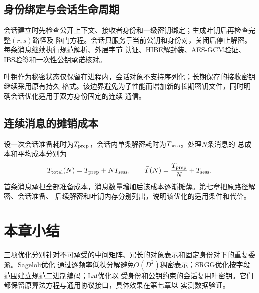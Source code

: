 \subsection{身份绑定与会话生命周期}

会话建立时先检查公开上下文、接收者身份和一级密钥绑定；生成叶钥后再检查完整$(r,s)$路径及
陷门方程。会话只服务于当前公钥和身份对，关闭后停止解密。每条消息继续执行规范解析、外层字节
认证、HIBE解封装、AES-GCM验证、IBS验签和一次性公钥承诺核对。

叶钥作为秘密状态仅保留在进程内，会话对象不支持序列化；长期保存的接收密钥继续采用原有持久
格式。该边界避免为了性能而增加新的长期密钥文件，同时明确会话优化适用于双方身份固定的连续
通信。

\subsection{连续消息的摊销成本}

设一次会话准备耗时为$T_{\rm prep}$，会话内单条解密耗时为$T_{\rm sess}$。处理$N$条消息的
总成本和平均成本分别为
\[
 T_{\rm total}(N)=T_{\rm prep}+NT_{\rm sess},\qquad
 \bar T(N)=\frac{T_{\rm prep}}{N}+T_{\rm sess}.
\]
首条消息承担全部准备成本，消息数量增加后该成本逐渐摊薄。第七章把原路径解密、会话准备、
后续解密和叶钥内存分别列出，说明该优化的适用条件和代价。

\section{本章小结}

三项优化分别针对不可承受的中间矩阵、冗长的对象表示和固定身份对下的重复委派。Sageloli优化
通过逐频率低秩分解避免$O(D^2)$稠密表示；SRGG优化按字段范围建立规范二进制编码；Lai优化以
受身份和公钥约束的会话复用叶密钥。它们都保留原算法方程与通用协议接口，具体效果在第七章以
实测数据验证。
